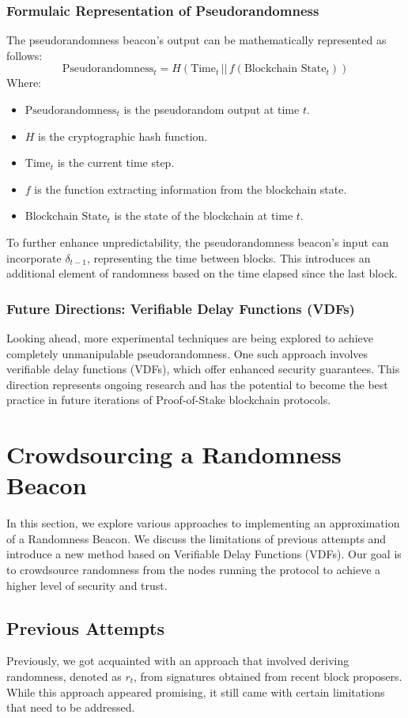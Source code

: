 \subsubsection{Formulaic Representation of Pseudorandomness}
The pseudorandomness beacon's output can be mathematically represented as follows:
\[
\text{Pseudorandomness}_{t} = H(\text{Time}_{t} \, || \, f(\text{Blockchain State}_{t}))
\]
Where:
\begin{itemize}
  \item $\text{Pseudorandomness}_{t}$ is the pseudorandom output at time $t$.
  \item $H$ is the cryptographic hash function.
  \item $\text{Time}_{t}$ is the current time step.
  \item $f$ is the function extracting information from the blockchain state.
  \item $\text{Blockchain State}_{t}$ is the state of the blockchain at time $t$.
\end{itemize}
To further enhance unpredictability, the pseudorandomness beacon's input can incorporate $\delta_{t-1}$, representing the time between blocks. This introduces an additional element of randomness based on the time elapsed since the last block.


\subsubsection{Future Directions: Verifiable Delay Functions (VDFs)}
Looking ahead, more experimental techniques are being explored to achieve completely unmanipulable pseudorandomness. One such approach involves verifiable delay functions (VDFs), which offer enhanced security guarantees. This direction represents ongoing research and has the potential to become the best practice in future iterations of Proof-of-Stake blockchain protocols.


\section{Crowdsourcing a Randomness Beacon}
In this section, we explore various approaches to implementing an approximation of a Randomness Beacon. We discuss the limitations of previous attempts and introduce a new method based on Verifiable Delay Functions (VDFs). Our goal is to crowdsource randomness from the nodes running the protocol to achieve a higher level of security and trust.
\subsection{Previous Attempts}
Previously, we got acquainted with an approach that involved deriving randomness, denoted as $r_t$, from signatures obtained from recent block proposers. While this approach appeared promising, it still came with certain limitations that need to be addressed.

